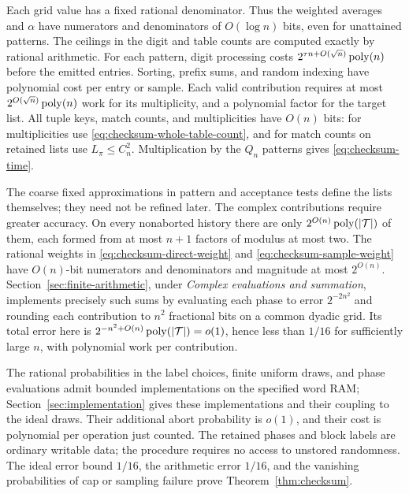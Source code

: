 Each grid value has a fixed rational denominator.  Thus the weighted
averages and $\alpha$ have numerators and denominators of $O(\log n)$
bits, even for unattained patterns.  The ceilings in the digit and
table counts are computed exactly by rational arithmetic.
For each pattern, digit processing costs
$2^{\tau n+O(\sqrt n)}\operatorname{poly}(n)$ before the emitted entries.
Sorting, prefix sums, and random indexing have polynomial cost per
entry or sample.  Each valid contribution requires at most
$2^{O(\sqrt n)}\operatorname{poly}(n)$ work for its multiplicity, and a polynomial
factor for the target list.  All tuple keys, match counts, and
multiplicities have $O(n)$ bits: for multiplicities use
\eqref{eq:checksum-whole-table-count}, and for match counts on retained
lists use $L_\pi\le C_n^2$.
Multiplication by the $Q_n$ patterns gives
\eqref{eq:checksum-time}.

The coarse fixed approximations in pattern and acceptance tests define
the lists themselves; they need not be refined later.  The complex
contributions require greater accuracy.  On every nonaborted history
there are only $2^{O(n)}\operatorname{poly}(|\mathcal T|)$ of them, each formed from
at most $n+1$ factors of modulus at most two.  The rational weights in
\eqref{eq:checksum-direct-weight} and
\eqref{eq:checksum-sample-weight} have $O(n)$-bit numerators and
denominators and magnitude at most $2^{O(n)}$.
Section~\ref{sec:finite-arithmetic}, under
\emph{Complex evaluations and summation}, implements precisely such
sums by evaluating each phase to error $2^{-2n^2}$ and rounding each
contribution to $n^2$ fractional bits on a common dyadic grid.  Its
total error here is
$2^{-n^2+O(n)}\operatorname{poly}(|\mathcal T|)=o(1)$, hence less than $1/16$
for sufficiently large $n$, with polynomial work per contribution.

The rational probabilities in the label choices, finite uniform draws,
and phase evaluations admit bounded implementations on the specified
word RAM; Section~\ref{sec:implementation} gives these implementations
and their coupling to the ideal draws.  Their additional abort
probability is $o(1)$, and their cost is polynomial per operation just
counted.  The retained phases and block labels are ordinary writable
data; the procedure requires no access to unstored randomness.
The ideal error bound $1/16$, the arithmetic error $1/16$, and the
vanishing probabilities of cap or sampling failure prove
Theorem~\ref{thm:checksum}.
